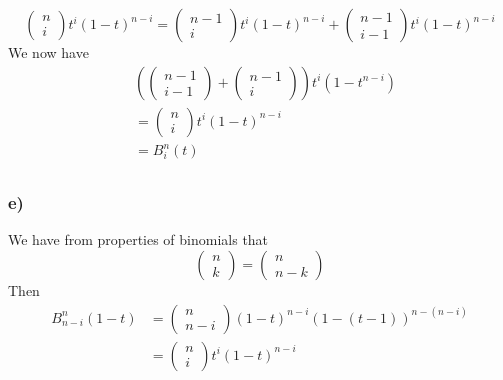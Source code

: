 \[
\begin{pmatrix*}
    n   \\
    i  
\end{pmatrix*}
t^i\left( 1-t\right) _{  }^{ n-i } = \begin{pmatrix*}
    n-1  \\
    i  
\end{pmatrix*}
t^i\left( 1-t\right) _{  }^{ n-i } + \begin{pmatrix*}
    n-1  \\
    i-1  
\end{pmatrix*}
t^{i}\left( 1-t\right) ^{n-i} 
\]
We now have 
\begin{align*}
    &\left( \begin{pmatrix*}
        n-1  \\
        i-1  
    \end{pmatrix*}
    + 
    \begin{pmatrix*}
        n-1  \\
        i  
    \end{pmatrix*}
\right) t^i\left( 1-t^{n-i} \right) \\
 &= \begin{pmatrix*}
     n   \\
     i  
 \end{pmatrix*}
 t^i\left( 1-t\right) ^{n-i}   \\ 
 &= B _{ i }^{ n  } (t) \\ 
\end{align*}

\subsubsection{e) }
We have from properties of binomials that 
\[
\begin{pmatrix*}
    n   \\
    k  
\end{pmatrix*}
= \begin{pmatrix*}
    n   \\
    n-k  
\end{pmatrix*}

\]
Then 
\begin{align*}
    B _{ n-i }^{ n } \left( 1 - t\right) &= 
\begin{pmatrix*}
     n \\
     n-i  
\end{pmatrix*}
\left( 1-t\right) ^{n-i} \left( 1-(t-1)\right) ^{ n - (n-i)} \\
                                         &= \begin{pmatrix*}
                                             n   \\
                                             i  
                                         \end{pmatrix*}
                                         t^i \left( 1-t\right) _{  }^{ n-i } 
\end{align*}

